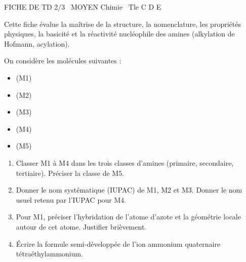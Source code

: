 \documentclass[11pt]{article}
\begin{document}
\begin{tcolorbox}[enhanced,colback=popink,colframe=popink,arc=10pt,boxrule=0pt,left=12pt,right=12pt,top=9pt,bottom=9pt]
{\color{white}\popxbold\small FICHE DE TD 2/3 \textbullet\ MOYEN \hfill Chimie \textbullet\ Tle C D E\par}
\end{tcolorbox}
\vspace{4pt}
Cette fiche évalue la maîtrise de la structure, la nomenclature, les propriétés physiques, la basicité et la réactivité nucléophile des amines (alkylation de Hofmann, acylation).

\begin{exercice}
On considère les molécules suivantes : 
\begin{itemize}
    \item {} \quad (M1)
    \item {} \quad (M2)
    \item {} \quad (M3)
    \item {} \quad (M4)
    \item {} \quad (M5)
\end{itemize}
\begin{enumerate}
    \item Classer M1 à M4 dans les trois classes d'amines (primaire, secondaire, tertiaire). Préciser la classe de M5.
    \item Donner le nom systématique (IUPAC) de M1, M2 et M3. Donner le nom usuel retenu par l'IUPAC pour M4.
    \item Pour M1, préciser l'hybridation de l'atome d'azote et la géométrie locale autour de cet atome. Justifier brièvement.
    \item Écrire la formule semi-développée de l'ion ammonium quaternaire tétraéthylammonium.
\end{enumerate}
\end{exercice}
\end{document}
